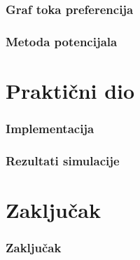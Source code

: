 \documentclass[11pt]{beamer}
\begin{document}
  \begin{frame}
    \frametitle{Graf toka preferencija}
  \end{frame}

  \begin{frame}
    \frametitle{Metoda potencijala}
  \end{frame}

  \section{Praktični dio}
  \begin{frame}
    \frametitle{Implementacija}
  \end{frame}

  \begin{frame}
    \frametitle{Rezultati simulacije}
  \end{frame}

  \section{Zaključak}
  \begin{frame}
    \frametitle{Zaključak}
  \end{frame}
  
\end{document}

